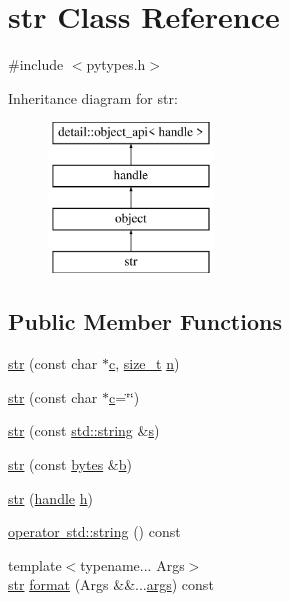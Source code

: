 \hypertarget{classstr}{}\section{str Class Reference}
\label{classstr}


{\ttfamily \#include $<$pytypes.\+h$>$}

Inheritance diagram for str\+:\begin{figure}[H]
\begin{center}
\leavevmode
\includegraphics[height=4.000000cm]{classstr}
\end{center}
\end{figure}
\subsection*{Public Member Functions}
\begin{DoxyCompactItemize}
\item 
\mbox{\hyperlink{classstr_a75cebb809550e845521f0a554452ddc3}{str}} (const char $\ast$\mbox{\hyperlink{_s_d_l__opengl__glext_8h_a1f2d7f8147412c43ba2303a56f97ee73}{c}}, \mbox{\hyperlink{detail_2common_8h_a801d6a451a01953ef8cbae6feb6a3638}{size\+\_\+t}} \mbox{\hyperlink{_s_d_l__opengl__glext_8h_ae2b4646468bc89d0ba646f5cf838e051}{n}})
\item 
\mbox{\hyperlink{classstr_a7275e75f478d9a5eff2d28d4a9ca9768}{str}} (const char $\ast$\mbox{\hyperlink{_s_d_l__opengl__glext_8h_a1f2d7f8147412c43ba2303a56f97ee73}{c}}=\char`\"{}\char`\"{})
\item 
\mbox{\hyperlink{classstr_aefc81e0d991f5df7e9d2e57a32308c33}{str}} (const \mbox{\hyperlink{_s_d_l__opengl__glext_8h_ab4ccfaa8ab0e1afaae94dc96ef52dde1}{std\+::string}} \&\mbox{\hyperlink{_s_d_l__opengl_8h_a4af680a6c683f88ed67b76f207f2e6e4}{s}})
\item 
\mbox{\hyperlink{group__pytypes_gad58fa3b0ad77f0cac09c65772c8116bb}{str}} (const \mbox{\hyperlink{classbytes}{bytes}} \&\mbox{\hyperlink{_s_d_l__opengl__glext_8h_a0f71581a41fd2264c8944126dabbd010}{b}})
\item 
\mbox{\hyperlink{classstr_a4bff3c112fa3379ba8a668ca1547b85a}{str}} (\mbox{\hyperlink{classhandle}{handle}} \mbox{\hyperlink{_s_d_l__opengl__glext_8h_afa0fb1b5e976920c0abeff2dca3ed774}{h}})
\item 
\mbox{\hyperlink{classstr_af5512b70bfeba2a0f83d752f74501d4f}{operator std\+::string}} () const
\item 
{\footnotesize template$<$typename... Args$>$ }\\\mbox{\hyperlink{classstr}{str}} \mbox{\hyperlink{classstr_a2919bac4ba269742be227ecdf70249af}{format}} (Args \&\&...\mbox{\hyperlink{classargs}{args}}) const
\end{DoxyCompactItemize}
